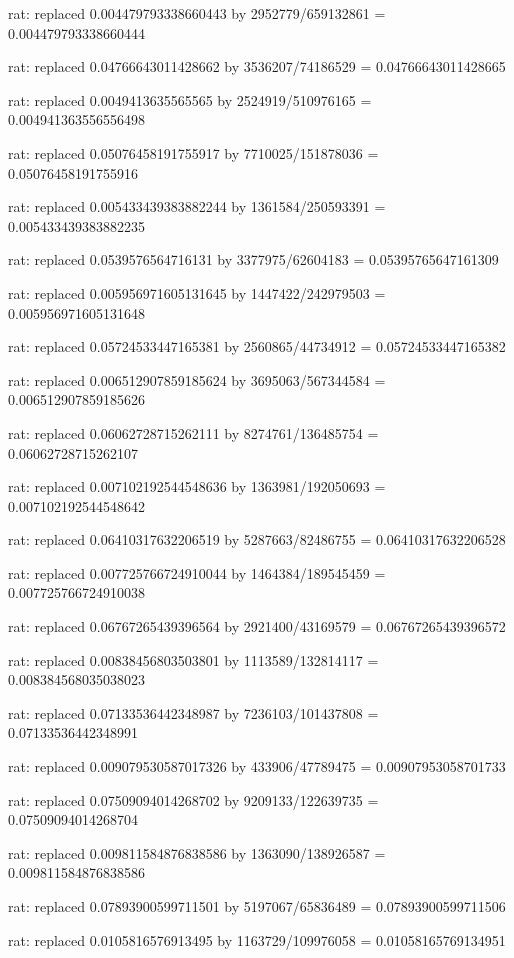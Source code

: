 \documentclass[a4paper,10pt]{article}
\begin{document}
\begin{eulernotebook}
\begin{eulercomment}
\begin{eulercomment}
\begin{eulercomment}
\begin{eulercomment}
\begin{eulercomment}
\begin{eulercomment}
\begin{eulercomment}
\begin{eulercomment}
\begin{eulercomment}
\begin{eulercomment}
\begin{eulercomment}
\begin{eulercomment}
\begin{eulercomment}
\begin{eulercomment}
\begin{eulercomment}
\begin{eulercomment}
\begin{euleroutput}
  rat: replaced 0.004479793338660443 by 2952779/659132861 = 0.004479793338660444
  
  rat: replaced 0.04766643011428662 by 3536207/74186529 = 0.04766643011428665
  
  rat: replaced 0.0049413635565565 by 2524919/510976165 = 0.004941363556556498
  
  rat: replaced 0.05076458191755917 by 7710025/151878036 = 0.05076458191755916
  
  rat: replaced 0.005433439383882244 by 1361584/250593391 = 0.005433439383882235
  
  rat: replaced 0.0539576564716131 by 3377975/62604183 = 0.05395765647161309
  
  rat: replaced 0.005956971605131645 by 1447422/242979503 = 0.005956971605131648
  
  rat: replaced 0.05724533447165381 by 2560865/44734912 = 0.05724533447165382
  
  rat: replaced 0.006512907859185624 by 3695063/567344584 = 0.006512907859185626
  
  rat: replaced 0.06062728715262111 by 8274761/136485754 = 0.06062728715262107
  
  rat: replaced 0.007102192544548636 by 1363981/192050693 = 0.007102192544548642
  
  rat: replaced 0.06410317632206519 by 5287663/82486755 = 0.06410317632206528
  
  rat: replaced 0.007725766724910044 by 1464384/189545459 = 0.007725766724910038
  
  rat: replaced 0.06767265439396564 by 2921400/43169579 = 0.06767265439396572
  
  rat: replaced 0.00838456803503801 by 1113589/132814117 = 0.008384568035038023
  
  rat: replaced 0.07133536442348987 by 7236103/101437808 = 0.07133536442348991
  
  rat: replaced 0.009079530587017326 by 433906/47789475 = 0.00907953058701733
  
  rat: replaced 0.07509094014268702 by 9209133/122639735 = 0.07509094014268704
  
  rat: replaced 0.009811584876838586 by 1363090/138926587 = 0.009811584876838586
  
  rat: replaced 0.07893900599711501 by 5197067/65836489 = 0.07893900599711506
  
  rat: replaced 0.0105816576913495 by 1163729/109976058 = 0.01058165769134951
  

\end{euleroutput}
\end{eulercomment}
\end{eulercomment}
\end{eulercomment}
\end{eulercomment}
\end{eulercomment}
\end{eulercomment}
\end{eulercomment}
\end{eulercomment}
\end{eulercomment}
\end{eulercomment}
\end{eulercomment}
\end{eulercomment}
\end{eulercomment}
\end{eulercomment}
\end{eulercomment}
\end{eulercomment}
\end{eulernotebook}
\end{document}

